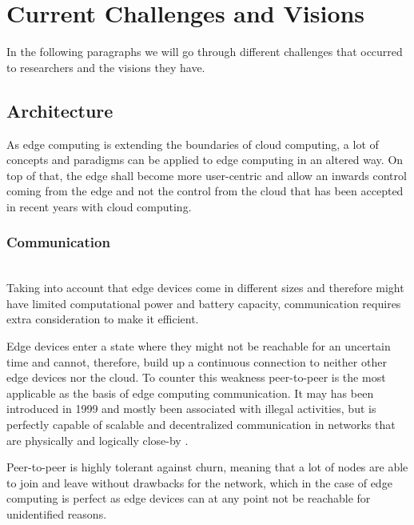 \section{Current Challenges and Visions}\label{sec:main}


In the following paragraphs we will go through different challenges that occurred to researchers and the visions they have.

\subsection{Architecture}
As edge computing is extending the boundaries of cloud computing, a lot of concepts and paradigms can be applied to edge computing in an altered way. On top of that, the edge shall become more user-centric and allow an inwards control coming from the edge and not the control from the cloud that has been accepted in recent years with cloud computing.

\subsubsection{Communication}\hspace*{\fill} \\
Taking into account that edge devices come in different sizes and therefore might have limited computational power and battery capacity, communication requires extra consideration to make it efficient.

Edge devices enter a state where they might not be reachable for an uncertain time and cannot, therefore, build up a continuous connection to neither other edge devices nor the cloud.
To counter this weakness peer-to-peer is the most applicable as the basis of edge computing communication. It may has been introduced in 1999 and mostly been associated with illegal activities, but is perfectly capable of scalable and decentralized communication in networks that are physically and logically close-by \cite{GarciaLopez:2015:ECV:2831347.2831354}.

Peer-to-peer is highly tolerant against churn, meaning that a lot of nodes are able to join and leave without drawbacks for the network, which in the case of edge computing is perfect as edge devices can at any point not be reachable for unidentified reasons.

